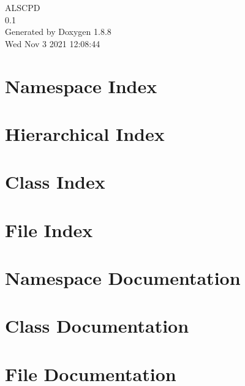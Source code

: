 \documentclass[twoside]{book}
\newcommand{\+}{\discretionary{\mbox{\scriptsize$\hookleftarrow$}}{}{}}
\newcommand{\clearemptydoublepage}{%
  \newpage{\pagestyle{empty}\cleardoublepage}%
}
\begin{document}
\hypersetup{pageanchor=false,
             bookmarks=true,
             bookmarksnumbered=true,
             pdfencoding=unicode
            }
\begin{titlepage}
\vspace*{7cm}
\begin{center}%
{\Large A\+L\+S\+C\+P\+D \\[1ex]\large 0.\+1 }\\
\vspace*{1cm}
{\large Generated by Doxygen 1.8.8}\\
\vspace*{0.5cm}
{\small Wed Nov 3 2021 12:08:44}\\
\end{center}
\end{titlepage}
\clearemptydoublepage
\tableofcontents
\clearemptydoublepage
{}
\hypersetup{pageanchor=true}

\chapter{Namespace Index}

\chapter{Hierarchical Index}

\chapter{Class Index}

\chapter{File Index}

\chapter{Namespace Documentation}











\chapter{Class Documentation}




\chapter{File Documentation}












\newpage
{}
{}
\printindex
\end{document}
